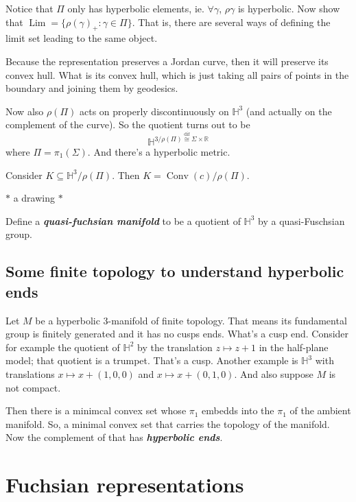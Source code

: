 \begin{exercise}\leavevmode
	Notice that $\Pi$ only has hyperbolic elements, ie. $\forall \gamma$, $\rho\gamma$ is hyperbolic. Now show that $\operatorname{Lim}=\{\rho(\gamma)_+:\gamma\in \Pi\}$. That is, there are several ways of defining the limit set leading to the same object.
\end{exercise}

 Because the representation preserves a Jordan curve, then it will preserve its convex hull. What is its convex hull, which is just taking all pairs of points in the boundary and joining them by geodesics.

 Now also $\rho(\Pi)$ acts on properly discontinuously on $\mathbb{H}^{3}$ (and actually on the complement of the curve). So the quotient turns out to be
 \[\mathbb{H}^{3/\rho(\Pi)\overset{\operatorname{dif}}{\cong } \Sigma\times \mathbb{R}}\]
 where $\Pi=\pi_{1}(\Sigma)$. And there's a hyperbolic metric.

 Consider $K\subseteq \mathbb{H}^{3}/\rho(\Pi)$. Then $K=\operatorname{Conv}(c)/\rho(\Pi)$.

 $*$ a drawing $*$

 Define a \textit{\textbf{quasi-fuchsian manifold}} to be a quotient of  $\mathbb{H}^{3}$ by a quasi-Fuschsian group.

 \subsection{Some finite topology to understand hyperbolic ends}
 
 Let $M$ be a hyperbolic 3-manifold of finite topology. That means its fundamental group is finitely generated and it has no cusps ends. What's a cusp end. Consider for example the quotient of $\mathbb{H}^{2}$ by the translation $z\mapsto z+1$ in the half-plane model; that quotient is a trumpet. That's a cusp. Another example is $\mathbb{H}^{3}$ with translations $x\mapsto x+(1,0,0)$ and $x\mapsto x+(0,1,0)$. And also suppose $M$ is not compact.

 Then there is a minimcal convex set whose $\pi_1$ embedds into the $\pi_1$ of the ambient manifold. So, a minimal convex set that carries the topology of the manifold. Now the complement of that has \textit{\textbf{hyperbolic ends}}.

\section{Fuchsian representations}

